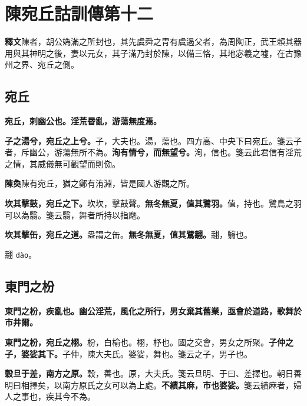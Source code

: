 \chapter{陳宛丘詁訓傳第十二}

\begin{quoting}\textbf{釋文}陳者，胡公媯滿之所封也，其先虞舜之冑有虞遏父者，為周陶正，武王賴其器用與其神明之後，妻以元女，其子滿乃封於陳，以備三恪，其地宓羲之墟，在古豫州之界、宛丘之側。\end{quoting}

\section{宛丘}


\textbf{宛丘，刺幽公也。淫荒昬亂，游蕩無度焉。}

\textbf{子之湯兮，宛丘之上兮。}{\footnotesize 子，大夫也。湯，蕩也。四方高、中央下曰宛丘。箋云子者，斥幽公，游蕩無所不為。}\textbf{洵有情兮，而無望兮。}{\footnotesize 洵，信也。箋云此君信有淫荒之情，其威儀無可觀望而則俲。}

\begin{quoting}\textbf{陳奐}陳有宛丘，猶之鄭有洧淵，皆是國人游觀之所。\end{quoting}

\textbf{坎其擊鼓，宛丘之下。}{\footnotesize 坎坎，擊鼓聲。}\textbf{無冬無夏，值其鷺羽。}{\footnotesize 值，持也。鷺鳥之羽可以為翳。箋云翳，舞者所持以指麾。}

\textbf{坎其擊缶，宛丘之道。}{\footnotesize 盎謂之缶。}\textbf{無冬無夏，值其鷺翿。}{\footnotesize 翿，翳也。}

\begin{quoting}翿 \texttt{dào}。\end{quoting}

\section{東門之枌}


\textbf{東門之枌，疾亂也。幽公淫荒，風化之所行，男女棄其舊業，亟會於道路，歌舞於市井爾。}

\textbf{東門之枌，宛丘之栩。}{\footnotesize 枌，白榆也。栩，杼也。國之交會，男女之所聚。}\textbf{子仲之子，婆娑其下。}{\footnotesize 子仲，陳大夫氏。婆娑，舞也。箋云之子，男子也。}

\textbf{穀旦于差，南方之原。}{\footnotesize 穀，善也。原，大夫氏。箋云旦明、于曰、差擇也。朝日善明曰相擇矣，以南方原氏之女可以為上處。}\textbf{不績其麻，市也婆娑。}{\footnotesize 箋云績麻者，婦人之事也，疾其今不為。}

